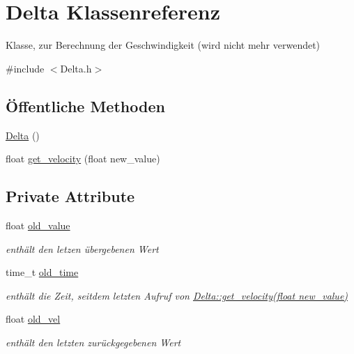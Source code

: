 \hypertarget{class_delta}{
\section{Delta Klassenreferenz}
\label{class_delta}
}


Klasse, zur Berechnung der Geschwindigkeit (wird nicht mehr verwendet)  




{\ttfamily \#include $<$Delta.h$>$}

\subsection*{Öffentliche Methoden}
\begin{DoxyCompactItemize}
\item 
\hyperlink{class_delta_a20c7bcc600ccfdf7a678872fa4d1a7a7}{Delta} ()
\item 
float \hyperlink{class_delta_a16d1cf25743928796d7cf1e5c7882c17}{get\_\-velocity} (float new\_\-value)
\end{DoxyCompactItemize}
\subsection*{Private Attribute}
\begin{DoxyCompactItemize}
\item 
float \hyperlink{class_delta_a1724264763801016d7d1c0d5f4817a96}{old\_\-value}
\begin{DoxyCompactList}\small\item\em enthält den letzen übergebenen Wert \end{DoxyCompactList}\item 
time\_\-t \hyperlink{class_delta_aec1a12c9785ec159f541663926eda55d}{old\_\-time}
\begin{DoxyCompactList}\small\item\em enthält die Zeit, seitdem letzten Aufruf von \hyperlink{class_delta_a16d1cf25743928796d7cf1e5c7882c17}{Delta::get\_\-velocity(float new\_\-value)} \end{DoxyCompactList}\item 
float \hyperlink{class_delta_a479029e6db0f2738547961f0d72bec78}{old\_\-vel}
\begin{DoxyCompactList}\small\item\em enthält den letzten zurückgegebenen Wert \end{DoxyCompactList}\end{DoxyCompactItemize}


